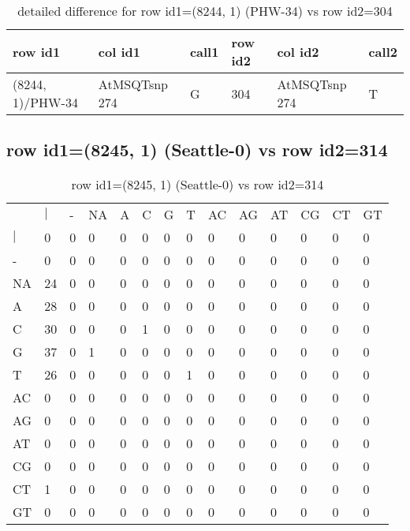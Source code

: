 \begin{center}
\begin{longtable}{|l|l|l|l|l|l|}
\caption{detailed difference for row id1=(8244, 1) (PHW-34) vs row id2=304} \label{table_dm379}\\
\hline
row id1&col id1&call1&row id2&col id2&call2\\
\hline
(8244, 1)/PHW-34&AtMSQTsnp 274&G&304&AtMSQTsnp 274&T\\
\hline
\end{longtable}
\end{center}

\subsection{row id1=(8245, 1) (Seattle-0) vs row id2=314}
\begin{center}
\begin{longtable}{|l|l|l|l|l|l|l|l|l|l|l|l|l|l|}
\caption{row id1=(8245, 1) (Seattle-0) vs row id2=314} \label{table_dm380}\\
\hline
\\
\hline
&$|$&-&NA&A&C&G&T&AC&AG&AT&CG&CT&GT\\
$|$&0&0&0&0&0&0&0&0&0&0&0&0&0\\
-&0&0&0&0&0&0&0&0&0&0&0&0&0\\
NA&24&0&0&0&0&0&0&0&0&0&0&0&0\\
A&28&0&0&0&0&0&0&0&0&0&0&0&0\\
C&30&0&0&0&1&0&0&0&0&0&0&0&0\\
G&37&0&1&0&0&0&0&0&0&0&0&0&0\\
T&26&0&0&0&0&0&1&0&0&0&0&0&0\\
AC&0&0&0&0&0&0&0&0&0&0&0&0&0\\
AG&0&0&0&0&0&0&0&0&0&0&0&0&0\\
AT&0&0&0&0&0&0&0&0&0&0&0&0&0\\
CG&0&0&0&0&0&0&0&0&0&0&0&0&0\\
CT&1&0&0&0&0&0&0&0&0&0&0&0&0\\
GT&0&0&0&0&0&0&0&0&0&0&0&0&0\\
\hline
\end{longtable}
\end{center}

